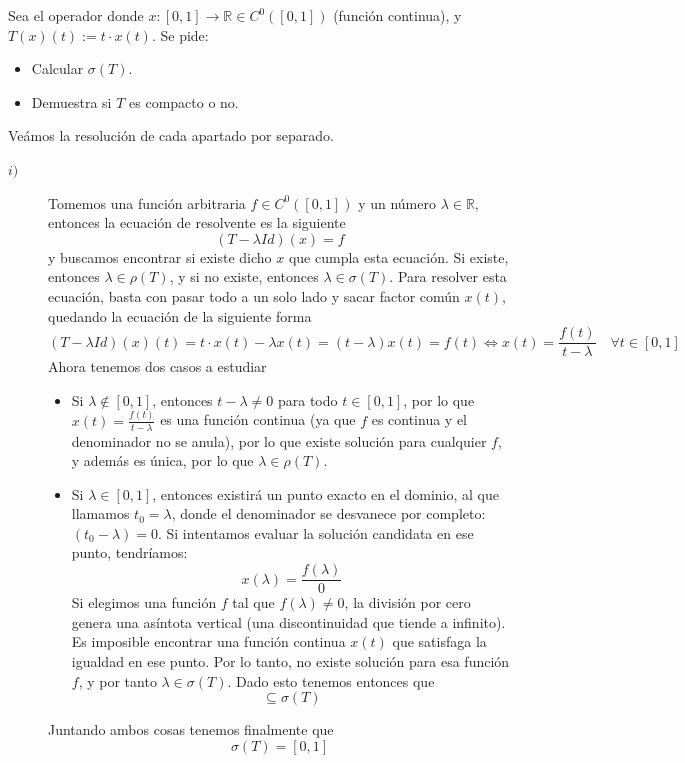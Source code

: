 \begin{ejercicio}
    Sea el operador
    donde $x: [0,1] \to \mathbb{R}\in C^0([0,1])$ (función continua), y $T(x)(t) := t\cdot x(t)$. Se pide:
    \begin{itemize}
        \item[i)] Calcular $\sigma(T)$.
        \item[ii)] Demuestra si $T$ es compacto o no.
    \end{itemize}
    Veámos la resolución de cada apartado por separado.
    \begin{description}
        \item[$i)$] Tomemos una función arbitraria $f \in C^0([0,1])$ y un número $\lambda \in \mathbb{R}$, entonces la ecuación de resolvente es la siguiente
        \begin{equation*}            
            (T - \lambda Id)(x) = f
        \end{equation*}
        y buscamos encontrar si existe dicho $x$ que cumpla esta ecuación. Si existe, entonces $\lambda \in \rho(T)$, y si no existe, entonces $\lambda \in \sigma(T)$. Para resolver esta ecuación, basta con pasar todo a un solo lado y sacar factor común $x(t)$, quedando la ecuación de la siguiente forma
        \begin{equation*}
            (T - \lambda Id)(x)(t) = t \cdot x(t) - \lambda x(t) = (t - \lambda) x(t) = f(t) \iff x(t) = \frac{f(t)}{t - \lambda} \quad \forall t \in [0,1]
        \end{equation*}
        Ahora tenemos dos casos a estudiar
        \begin{itemize}
            \item Si $\lambda \notin [0,1]$, entonces $t - \lambda \neq 0$ para todo $t \in [0,1]$, por lo que $x(t) = \frac{f(t)}{t - \lambda}$ es una función continua (ya que $f$ es continua y el denominador no se anula), por lo que existe solución para cualquier $f$, y además es única, por lo que $\lambda \in \rho(T)$.
            \item Si $\lambda \in [0,1]$, entonces existirá un punto exacto en el dominio, al que llamamos $t_0 = \lambda$, donde el denominador se desvanece por completo: $(t_0 - \lambda) = 0$. Si intentamos evaluar la solución candidata en ese punto, tendríamos:$$x(\lambda) = \frac{f(\lambda)}{0}$$Si elegimos una función $f$ tal que $f(\lambda) \neq 0$, la división por cero genera una asíntota vertical (una discontinuidad que tiende a infinito). Es imposible encontrar una función continua $x(t)$ que satisfaga la igualdad en ese punto. Por lo tanto, no existe solución para esa función $f$, y por tanto $\lambda \in \sigma(T)$. Dado esto tenemos entonces que 
            \begin{equation*}
                [0,1]\subseteq \sigma(T)
            \end{equation*}
        \end{itemize}
        Juntando ambos cosas tenemos finalmente que 
        \begin{equation*}
            \sigma(T) = [0,1]
        \end{equation*}
        

\end{description}
\end{ejercicio}
